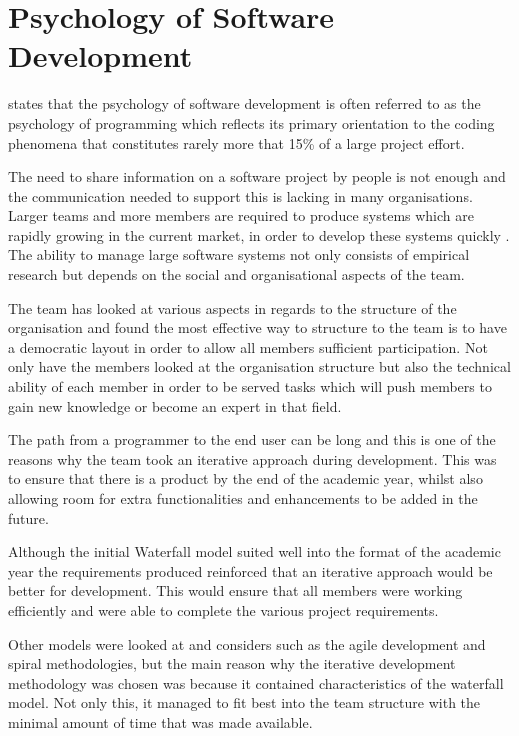 \section{Psychology of Software Development}
\label{sec:psychology_of_software_development}

\citet{progpro86} states that the psychology of software development is often
referred to as the psychology of programming which reflects its primary
orientation to the coding phenomena that constitutes rarely more that 15\% of a 
large project effort.

The need to share information on a software project by people is not enough and
the communication needed to support this is lacking in many organisations.
Larger teams and more members are required to produce systems which are rapidly
growing in the current market, in order to develop these systems quickly
\citep{see81}. The ability to manage large software systems not only consists of
empirical research but depends on the social and organisational aspects of the
team.

The team has looked at various aspects in regards to the structure of the
organisation and found the most effective way to structure to the team is to
have a democratic layout in order to allow all members sufficient participation.
Not only have the members looked at the organisation structure but also the
technical ability of each member in order to be served tasks which will push
members to gain new knowledge or become an expert in that field.

The path from a programmer to the end user can be long and this is one of the
reasons why the team took an iterative approach during development. This was to
ensure that there is a product by the end of the academic year, whilst also
allowing room for extra functionalities and enhancements to be added in the
future.

Although the initial Waterfall model suited well into the format of the academic
year the requirements produced reinforced that an iterative approach would be
better for development. This would ensure that all members were working
efficiently and were able to complete the various project requirements.

Other models were looked at and considers such as the agile development and
spiral methodologies, but the main reason why the iterative development
methodology was chosen was because it contained characteristics of the waterfall
model. Not only this, it managed to fit best into the team structure with the
minimal amount of time that was made available.
